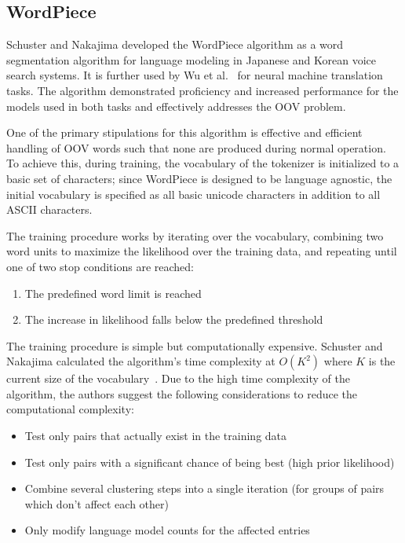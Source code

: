 \documentclass[12pt]{article}
\begin{document}
\subsection{WordPiece}\label{sec:wordpiece}
Schuster and Nakajima \cite{schuster_japanese_2012} developed the WordPiece algorithm as a word segmentation algorithm for language modeling in Japanese and Korean voice search systems. It is further used by Wu et al.~\cite{wu_googles_2016} for neural machine translation tasks. The algorithm demonstrated proficiency and increased performance for the models used in both tasks and effectively addresses the OOV problem.

One of the primary stipulations for this algorithm is effective and efficient handling of OOV words such that none are produced during normal
operation. To achieve this, during training, the vocabulary of the tokenizer is initialized to a basic set of characters; since WordPiece is designed
to be language agnostic, the initial vocabulary is specified as all basic unicode characters in addition to all ASCII characters.

The training procedure works by iterating over the vocabulary, combining two word units to maximize the likelihood over the training data, and
repeating until one of two stop conditions are reached:

\begin{enumerate}
    \item The predefined word limit is reached
    \item The increase in likelihood falls below the predefined threshold
\end{enumerate}

The training procedure is simple but computationally expensive. Schuster and Nakajima calculated the algorithm's time complexity at $O(K^2)$ where $K$ is the current size of the vocabulary~\cite{schuster_japanese_2012}. Due to the high time complexity of the algorithm, the authors suggest the following considerations to reduce the computational complexity:

\begin{itemize}
    \item Test only pairs that actually exist in the training data
    \item Test only pairs with a significant chance of being best (high prior likelihood)
    \item Combine several clustering steps into a single iteration (for groups of pairs which don't affect each other)
    \item Only modify language model counts for the affected entries
\end{itemize}
\end{document}
